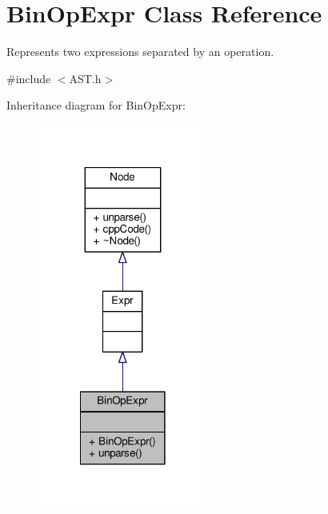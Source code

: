 \hypertarget{classBinOpExpr}{\section{Bin\-Op\-Expr Class Reference}
\label{classBinOpExpr}
}


Represents two expressions separated by an operation. \par
  




{\ttfamily \#include $<$A\-S\-T.\-h$>$}



Inheritance diagram for Bin\-Op\-Expr\-:\nopagebreak
\begin{figure}[H]
\begin{center}
\leavevmode
\includegraphics[width=158pt]{classBinOpExpr__inherit__graph}
\end{center}
\end{figure}


